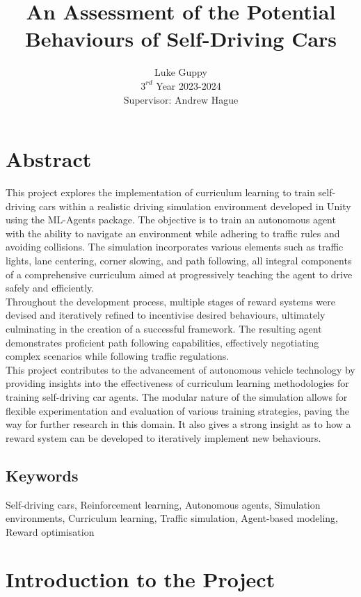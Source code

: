 \documentclass{article}
\title{\LARGE\bfseries An Assessment of the Potential Behaviours of Self-Driving Cars}
\author{Luke Guppy \\
$3^{rd}$ Year 2023-2024 \\
Supervisor: Andrew Hague}
\date{}
\begin{document}
\maketitle

\newpage
\tableofcontents
\newpage

\section*{Abstract}
This project explores the implementation of curriculum learning to train self-driving cars within a realistic driving simulation environment developed in Unity using the ML-Agents package. The objective is to train an autonomous agent with the ability to navigate an environment while adhering to traffic rules and avoiding collisions. The simulation incorporates various elements such as traffic lights, lane centering, corner slowing, and path following, all integral components of a comprehensive curriculum aimed at progressively teaching the agent to drive safely and efficiently.\\

Throughout the development process, multiple stages of reward systems were devised and iteratively refined to incentivise desired behaviours, ultimately culminating in the creation of a successful framework. The resulting agent demonstrates proficient path following capabilities, effectively negotiating complex scenarios while following traffic regulations.\\

This project contributes to the advancement of autonomous vehicle technology by providing insights into the effectiveness of curriculum learning methodologies for training self-driving car agents. The modular nature of the simulation allows for flexible experimentation and evaluation of various training strategies, paving the way for further research in this domain. It also gives a strong insight as to how a reward system can be developed to iteratively implement new behaviours.

\subsection*{Keywords}
Self-driving cars, Reinforcement learning, Autonomous agents, Simulation environments, Curriculum learning, Traffic simulation, Agent-based modeling, Reward optimisation

\section{Introduction to the Project}
\lipsum[2][1]
\end{document}
